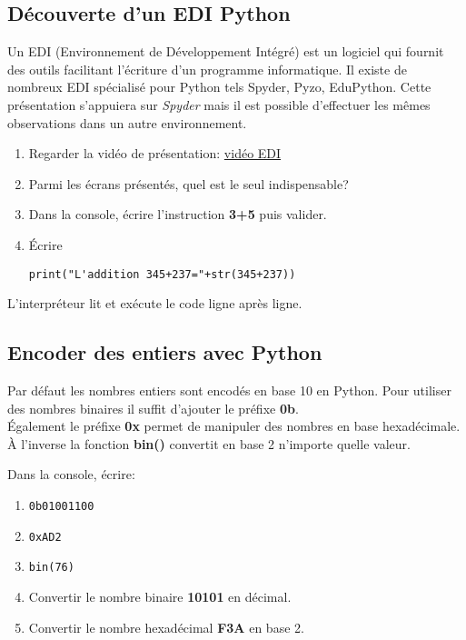\documentclass[a4paper,11pt]{article}
\begin{document}
\begin{Form}
\subsection{Découverte d'un EDI Python}
Un EDI (Environnement de Développement Intégré) est un logiciel qui fournit des outils facilitant l'écriture d'un programme informatique. Il existe de nombreux EDI spécialisé pour Python tels Spyder, Pyzo, EduPython. Cette présentation s'appuiera sur \emph{Spyder} mais il est possible d'effectuer les mêmes observations dans un autre environnement.
\begin{activite}
\begin{enumerate}
\item Regarder la vidéo de présentation: \href{https://cviroulaud.github.io/premiere/architectures/representation-entier-naturel/ressources/edi.html}{vidéo EDI}
\item Parmi les écrans présentés, quel est le seul indispensable?
\item Dans la console, écrire l'instruction \textbf{3+5} puis valider.
\item Écrire \begin{lstlisting}
print("L'addition 345+237="+str(345+237))
\end{lstlisting}
\end{enumerate}
\end{activite}
L'interpréteur lit et exécute le code ligne après ligne.
\subsection{Encoder des entiers avec Python}
Par défaut les nombres entiers sont encodés en base 10 en Python. Pour utiliser des nombres binaires il suffit d'ajouter le préfixe \textbf{0b}.\\
Également le préfixe \textbf{0x} permet de manipuler des nombres en base hexadécimale.\\
À l'inverse la fonction \textbf{bin()} convertit en base 2 n'importe quelle valeur.
\begin{activite}
Dans la console, écrire:
\begin{enumerate}
\item \begin{lstlisting}
0b01001100
\end{lstlisting}
\item \begin{lstlisting}
0xAD2
\end{lstlisting}
\item \begin{lstlisting}
bin(76)
\end{lstlisting}
\item Convertir le nombre binaire \textbf{10101} en décimal.
\item Convertir le nombre hexadécimal \textbf{F3A} en base 2.
\end{enumerate}
\end{activite}

\end{Form}
\end{document}
